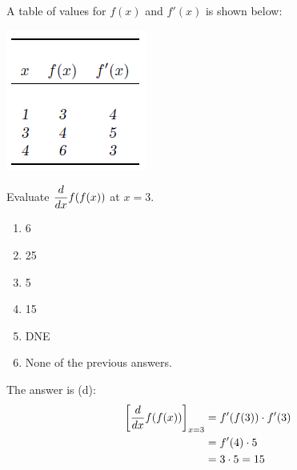\documentclass[nooutcomes,handout]{ximera}
\begin{document}
\begin{problem}
 A table of values for $f(x)$ and $f'(x)$ is shown below:

\begin{image}
	\includegraphics[scale=.8]{figure1.png}
\end{image}

  Evaluate $\displaystyle\frac{d}{dx} f(f(x))$ at $x = 3$.
  \begin{enumerate}
    \item 6
    \item 25
    \item 5
    \item 15
    \item DNE
    \item None of the previous answers.
  \end{enumerate}
  \begin{freeResponse}
    The answer is (d):
    \begin{align*}
      \bigg[ \frac{d}{dx} f(f(x)) \bigg]_{x = 3} &= f'(f(3)) \cdot f'(3) \\
      &= f'(4)\cdot 5 \\
      &= 3 \cdot 5 = 15
    \end{align*}
  \end{freeResponse}
	
\end{problem}
\end{document}
